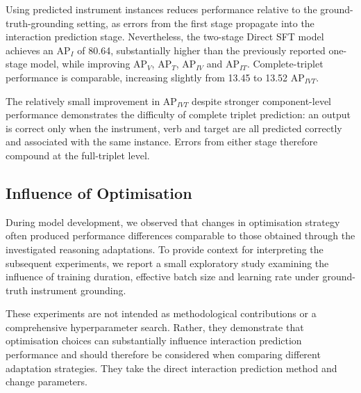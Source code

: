 \documentclass[11pt]{article}
\begin{document}
Using predicted instrument instances reduces performance relative to the
ground-truth-grounding setting, as errors from the first stage propagate into
the interaction prediction stage. Nevertheless, the two-stage Direct SFT model
achieves an AP$_I$ of 80.64, substantially higher than the previously reported
one-stage model, while improving AP$_V$, AP$_T$, AP$_{IV}$ and AP$_{IT}$.
Complete-triplet performance is comparable, increasing slightly from 13.45 to
13.52 AP$_{IVT}$.

The relatively small improvement in AP$_{IVT}$ despite stronger component-level
performance demonstrates the difficulty of complete triplet prediction: an
output is correct only when the instrument, verb and target are all predicted
correctly and associated with the same instance. Errors from either stage
therefore compound at the full-triplet level.


\subsection{Influence of Optimisation}
During model development, we observed that changes in optimisation strategy often
produced performance differences comparable to those obtained through the
investigated reasoning adaptations. To provide context for interpreting the
subsequent experiments, we report a small exploratory study examining the
influence of training duration, effective batch size and learning rate under
ground-truth instrument grounding.

These experiments are not intended as methodological contributions or a
comprehensive hyperparameter search. Rather, they demonstrate that optimisation
choices can substantially influence interaction prediction performance and
should therefore be considered when comparing different adaptation strategies. They take the direct interaction prediction method and change parameters. 
\end{document}
